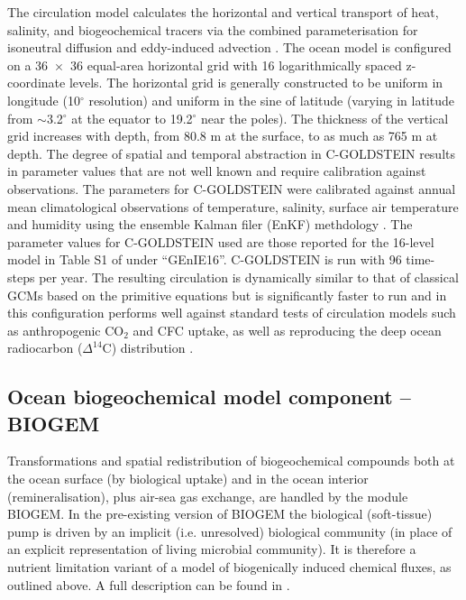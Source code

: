\documentclass[gmd, manuscript]{copernicus}
\begin{document}
The circulation model calculates the horizontal and vertical transport of heat, salinity, and biogeochemical tracers via the combined parameterisation for isoneutral diffusion and eddy-induced advection \citep{EdwardsMarsh:2005,Marsh:2011}. The ocean model is configured on a 36~$\times$~36 equal-area horizontal grid with 16 logarithmically spaced z-coordinate levels. The horizontal grid is generally constructed to be uniform in longitude (10$^\circ$ resolution) and uniform in the sine of latitude (varying in latitude from $\sim$3.2$^\circ$ at the equator to 19.2$^\circ$ near the poles). The thickness of the vertical grid increases with depth, from 80.8 m at the surface, to as much as 765 m at depth. The degree of spatial and temporal abstraction in C-GOLDSTEIN results in parameter values that are not well known and require calibration against observations. The parameters for C-GOLDSTEIN were calibrated against annual mean climatological observations of temperature, salinity, surface air temperature and humidity using the ensemble Kalman filer (EnKF) methdology \citep{Hargreaves:2004,Ridgwell:2007}. The parameter values for C-GOLDSTEIN used are those reported for the 16-level model in Table S1 of \citet{Cao:2009} under ``GEnIE16''. C-GOLDSTEIN is run with 96 time-steps per year.  The resulting circulation is dynamically similar to that of classical GCMs based on the primitive equations but is significantly faster to run and in this configuration performs well against standard tests of circulation models such as anthropogenic CO$_2$ and CFC uptake, as well as reproducing the deep ocean radiocarbon ($\Delta^{14}$C) distribution \citep{Cao:2009}.


%
\subsection{Ocean biogeochemical model component -- BIOGEM}\label{BIOGEM}

Transformations and spatial redistribution of biogeochemical compounds both at the ocean surface (by biological uptake) and in the ocean interior (remineralisation), plus  air-sea gas exchange, are handled by the module BIOGEM. In the pre-existing version of BIOGEM the biological (soft-tissue) pump is driven by an implicit (i.e. unresolved) biological community (in place of an explicit representation of living microbial community). It is therefore a nutrient limitation variant of a model of biogenically induced chemical fluxes, as outlined above. A full description can be found in \citep{Ridgwell:2007, Ridgwell:prep}.  
\end{document}
